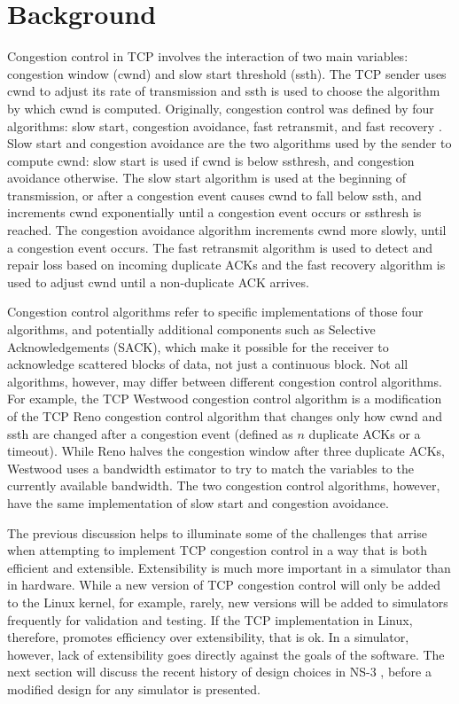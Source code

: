 \documentclass[conference]{IEEEtran}
\begin{document}
\section{Background}

Congestion control in TCP involves the interaction of two main variables: congestion window (cwnd) and slow start threshold (ssth). The TCP sender uses cwnd to adjust its rate of transmission and ssth is used to choose the algorithm by which cwnd is computed. Originally, congestion control was defined by four algorithms: slow start, congestion avoidance, fast retransmit, and fast recovery \cite{RFC5681}. Slow start and congestion avoidance are the two algorithms used by the sender to compute cwnd: slow start is used if cwnd is below ssthresh, and congestion avoidance otherwise. The slow start algorithm is used at the beginning of transmission, or after a congestion event causes cwnd to fall below ssth, and increments cwnd exponentially until a congestion event occurs or ssthresh is reached. The congestion avoidance algorithm increments cwnd more slowly, until a congestion event occurs. The fast retransmit algorithm is used to detect and repair loss based on incoming duplicate ACKs and the fast recovery algorithm is used to adjust cwnd until a non-duplicate ACK arrives. 

Congestion control algorithms refer to specific implementations of those four algorithms, and potentially additional components such as Selective Acknowledgements (SACK), which make it possible for the receiver to acknowledge scattered blocks of data, not just a continuous block. Not all algorithms, however, may differ between different congestion control algorithms. For example, the TCP Westwood \cite{WW} congestion control algorithm is a modification of the TCP Reno congestion control algorithm that changes only how cwnd and ssth are changed after a congestion event (defined as $n$ duplicate ACKs or a timeout). While Reno halves the congestion window after three duplicate ACKs, Westwood uses a bandwidth estimator to try to match the variables to the currently available bandwidth\cite{WW}. The two congestion control algorithms, however, have the same implementation of slow start and congestion avoidance. 

The previous discussion helps to illuminate some of the challenges that arrise when attempting to implement TCP congestion control in a way that is both efficient and extensible. Extensibility is much more important in a simulator than in hardware. While a new version of TCP congestion control will only be added to the Linux kernel, for example, rarely, new versions will be added to simulators frequently for validation and testing. If the TCP implementation in Linux, therefore, promotes efficiency over extensibility, that is ok. In a simulator, however, lack of extensibility goes directly against the goals of the software. The next section will discuss the recent history of design choices in NS-3 , before a modified design for any simulator is presented. 
\end{document}

